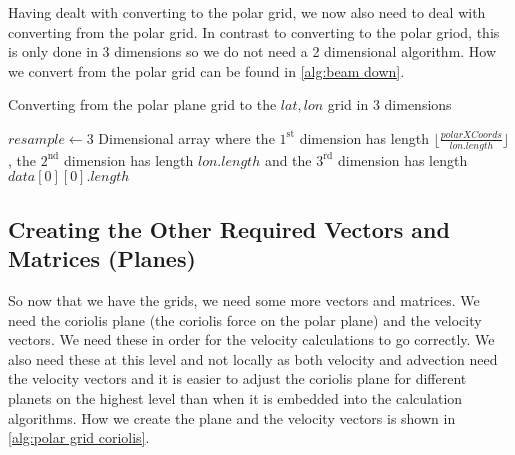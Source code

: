 Having dealt with converting to the polar grid, we now also need to deal with converting from the polar grid. In contrast to converting to the polar griod, this is only done in 3 dimensions so 
we do not need a 2 dimensional algorithm. How we convert from the polar grid can be found in \autoref{alg:beam down}.

\begin{algorithm}[htb]
    \caption{Converting from the polar plane grid to the $lat, lon$ grid in 3 dimensions}
    \label{alg:beam down}
    $resample \leftarrow $3 Dimensional array where the $1^{\text{st}}$ dimension has length $\lfloor \frac{polarXCoords}{lon.length} \rfloor$, the $2^{\text{nd}}$ dimension has length 
    $lon.length$ and the $3^{\text{rd}}$ dimension has length $data[0][0].length$ \;
\end{algorithm}

\subsection{Creating the Other Required Vectors and Matrices (Planes)}
So now that we have the grids, we need some more vectors and matrices. We need the coriolis plane (the coriolis force on the polar plane) and the velocity vectors. We need these in order for the 
velocity calculations to go correctly. We also need these at this level and not locally as both velocity and advection need the velocity vectors and it is easier to adjust the coriolis plane for 
different planets on the highest level than when it is embedded into the calculation algorithms. How we create the plane and the velocity vectors is shown in \autoref{alg:polar grid coriolis}.

